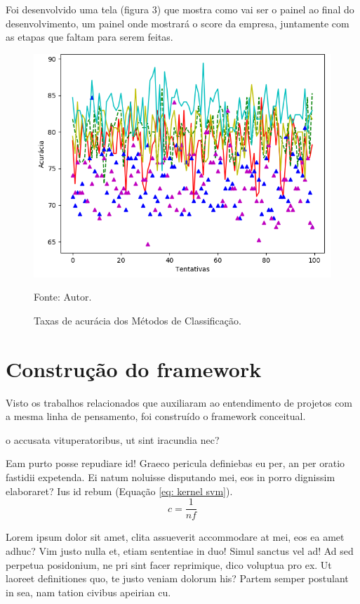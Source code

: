\documentclass[
	12pt,				%
	openright,			%
	oneside,			%
	a4paper,			%
	english,			%
	french,				%
	spanish,			%
	brazil,				%
	]{abntex2}
\begin{document}
Foi desenvolvido uma tela (figura 3) que mostra como vai ser o painel ao final do desenvolvimento, um painel onde mostrará o score da empresa, juntamente com as etapas que faltam para serem feitas.

\begin{figure}[ht]
    \centering
    \caption{Taxas de acurácia dos Métodos de Classificação.}
    \includegraphics[width=5.0in]{Images/acc-classification.png}
    \label{fig: grafico-acc}
    
    \centering \small Fonte: Autor.
\end{figure}

\section{Construção do framework}


Visto os trabalhos relacionados que auxiliaram ao entendimento de projetos com a mesma linha de pensamento, foi construído o framework conceitual. 

o accusata vituperatoribus, ut sint iracundia nec?

Eam purto posse repudiare id! Graeco pericula definiebas eu per, an per oratio fastidii expetenda. Ei natum noluisse disputando mei, eos in porro dignissim elaboraret? Ius id rebum (Equação \ref{eq: kernel svm}).
\begin{equation}
\label{eq: kernel svm}
    c = \frac {1} {\textit{nf}}
\end{equation}

Lorem ipsum dolor sit amet, clita assueverit accommodare at mei, eos ea amet adhuc? Vim justo nulla et, etiam sententiae in duo! Simul sanctus vel ad! Ad sed perpetua posidonium, ne pri sint facer reprimique, dico voluptua pro ex. Ut laoreet definitiones quo, te justo veniam dolorum his? Partem semper postulant in sea, nam tation civibus apeirian cu.
\end{document}
